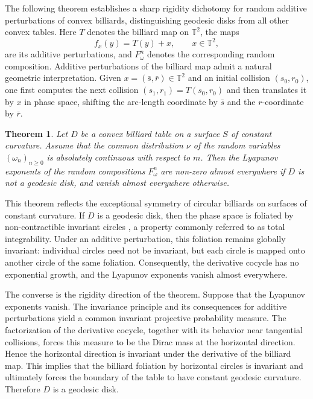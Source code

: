 \documentclass[a4paper,12pt,reqno]{amsart}
\numberwithin{equation}{section}
\newtheorem{theorem}{Theorem}[section]
\newcommand{\Tt}{{\mathbb{T}}}
\begin{document}
The following theorem establishes a sharp rigidity dichotomy for random additive perturbations of convex billiards, distinguishing geodesic disks from all other convex tables. Here $T$ denotes the billiard map on $\Tt^2$, the maps
\[
f_x(y)=T(y)+x, \qquad x \in \Tt^2,
\]
are its additive perturbations, and $F_\omega^n$ denotes the corresponding random composition. Additive perturbations of the billiard map admit a natural geometric interpretation. Given $x=(\bar s,\bar r)\in\Tt^2$ and an initial collision $(s_0,r_0)$, one first computes the next collision $(s_1,r_1)=T(s_0,r_0)$
and then translates it by $x$ in phase space, shifting the arc-length coordinate by $\bar s$ and the $r$-coordinate by $\bar r$.

\begin{theorem}
\label{thm:main}
Let $D$ be a convex billiard table on a surface $S$ of constant curvature. Assume that the common distribution $\nu$ of the random variables $(\omega_n)_{n\geq0}$ is absolutely continuous with respect to $m$. Then the Lyapunov exponents of the random compositions $F_\omega^n$ are non-zero almost everywhere if $D$ is not a geodesic disk, and vanish almost everywhere otherwise.
\end{theorem}

This theorem reflects the exceptional symmetry of circular billiards on surfaces of constant curvature. If $D$ is a geodesic disk, then the phase space is foliated by non-contractible invariant circles \cite{Bialy:1993ty,dosSantos:2017}, a property commonly referred to as total integrability. Under an additive perturbation, this foliation remains globally invariant: individual circles need not be invariant, but each circle is mapped onto another circle of the same foliation. Consequently, the derivative cocycle has no exponential growth, and the Lyapunov exponents vanish almost everywhere.

The converse is the rigidity direction of the theorem. Suppose that the Lyapunov exponents vanish. The invariance principle and its consequences for additive perturbations yield a common invariant projective probability measure. The factorization of the derivative cocycle, together with its behavior near tangential collisions, forces this measure to be the Dirac mass at the horizontal direction. Hence the horizontal direction is invariant under the derivative of the billiard map. This implies that the billiard foliation by horizontal circles is invariant and ultimately forces the boundary of the table to have constant geodesic curvature. Therefore $D$ is a geodesic disk.
\end{document}
